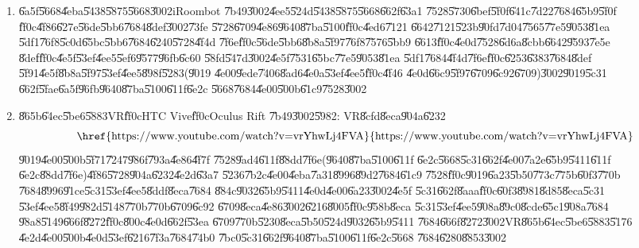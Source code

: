 \documentclass[12pt,a4paper]{article}
\begin{document}
\begin{enumerate}
\item \U{6a5f}\U{5668}\U{4eba}\U{5438}\U{5875}\U{5668}\U{3002}iRoombot%
\U{7b49}\U{3002}\U{4ee5}\U{524d}\U{5438}\U{5875}\U{5668}\U{662f}\U{63a1}%
\U{7528}\U{5730}\U{6bef}\U{5f0f}\U{641c}\U{7d22}\U{7684}\U{65b9}\U{5f0f}%
\U{ff0c}\U{4f86}\U{627e}\U{56de}\U{5bb6}\U{7684}\U{8def}\U{3002}\U{73fe}%
\U{5728}\U{6709}\U{4e86}\U{9640}\U{87ba}\U{5100}\U{ff0c}\U{4ed6}\U{7121}%
\U{6642}\U{7121}\U{523b}\U{90fd}\U{7d04}\U{7565}\U{77e5}\U{9053}\U{81ea}%
\U{5df1}\U{76f8}\U{5c0d}\U{65bc}\U{5bb6}\U{7684}\U{6240}\U{5728}\U{4f4d}%
\U{7f6e}\U{ff0c}\U{56de}\U{5bb6}\U{8b8a}\U{5f97}\U{76f8}\U{7576}\U{5bb9}%
\U{6613}\U{ff0c}\U{4e0d}\U{7528}\U{6d6a}\U{8cbb}\U{6642}\U{9593}\U{7e5e}%
\U{8def}\U{ff0c}\U{4e5f}\U{53ef}\U{4ee5}\U{5ef6}\U{9577}\U{96fb}\U{6c60}%
\U{58fd}\U{547d}\U{3002}\U{4e5f}\U{7531}\U{65bc}\U{77e5}\U{9053}\U{81ea}%
\U{5df1}\U{7684}\U{4f4d}\U{7f6e}\U{ff0c}\U{6253}\U{6383}\U{7684}\U{8def}%
\U{5f91}\U{4e5f}\U{8b8a}\U{5f97}\U{53ef}\U{4ee5}\U{898f}\U{5283}(\U{9019}%
\U{4e00}\U{9ede}\U{7406}\U{8ad6}\U{4e0a}\U{53ef}\U{4ee5}\U{ff0c}\U{4f46}%
\U{4e0d}\U{66c9}\U{5f97}\U{6709}\U{6c92}\U{6709})\U{3002}\U{9019}\U{5c31}%
\U{662f}\U{5fae}\U{6a5f}\U{96fb}\U{9640}\U{87ba}\U{5100}\U{611f}\U{6e2c}%
\U{5668}\U{7684}\U{4e00}\U{500b}\U{61c9}\U{7528}\U{3002}

\item \U{865b}\U{64ec}\U{5be6}\U{5883}VR\U{ff0c}HTC Vive\U{ff0c}Oculus Rift%
\U{7b49}\U{3002}\U{5982}: VR\U{8cfd}\U{8eca}\U{904a}\U{6232}%
\begin{equation*}
\text{\href{https://www.youtube.com/watch?v=vrYhwLj4FVA}{%
https://www.youtube.com/watch?v=vrYhwLj4FVA}}
\end{equation*}%
\U{9019}\U{4e00}\U{500b}\U{5f71}\U{7247}\U{986f}\U{793a}\U{4e86}\U{4f7f}%
\U{7528}\U{9ad4}\U{611f}\U{88dd}\U{7f6e}(\U{9640}\U{87ba}\U{5100}\U{611f}%
\U{6e2c}\U{5668}\U{5c31}\U{662f}\U{4e00}\U{7a2e}\U{65b9}\U{5411}\U{611f}%
\U{6e2c}\U{88dd}\U{7f6e})\U{4f86}\U{5728}\U{904a}\U{6232}\U{4e2d}\U{63a7}%
\U{5236}\U{7b2c}\U{4e00}\U{4eba}\U{7a31}\U{8996}\U{89d2}\U{7684}\U{61c9}%
\U{7528}\U{ff0c}\U{9019}\U{6a23}\U{5b50}\U{773c}\U{775b}\U{60f3}\U{770b}%
\U{7684}\U{8996}\U{91ce}\U{5c31}\U{53ef}\U{4ee5}\U{8ddf}\U{8eca}\U{7684}%
\U{884c}\U{9032}\U{65b9}\U{5411}\U{4e0d}\U{4e00}\U{6a23}\U{3002}\U{4e5f}%
\U{5c31}\U{662f}\U{8aaa}\U{ff0c}\U{60f3}\U{8981}\U{8d85}\U{8eca}\U{5c31}%
\U{53ef}\U{4ee5}\U{8f49}\U{982d}\U{5148}\U{770b}\U{770b}\U{6709}\U{6c92}%
\U{6709}\U{8eca}\U{4e86}\U{3002}\U{6216}\U{8005}\U{ff0c}\U{958b}\U{8eca}%
\U{5c31}\U{53ef}\U{4ee5}\U{908a}\U{89c0}\U{8cde}\U{65c1}\U{908a}\U{7684}%
\U{98a8}\U{5149}\U{666f}\U{8272}\U{ff0c}\U{800c}\U{4e0d}\U{662f}\U{53ea}%
\U{6709}\U{770b}\U{5230}\U{8eca}\U{5b50}\U{524d}\U{9032}\U{65b9}\U{5411}%
\U{7684}\U{666f}\U{8272}\U{3002}VR\U{865b}\U{64ec}\U{5be6}\U{5883}\U{5176}%
\U{4e2d}\U{4e00}\U{500b}\U{4e0d}\U{53ef}\U{6216}\U{7f3a}\U{7684}\U{74b0}%
\U{7bc0}\U{5c31}\U{662f}\U{9640}\U{87ba}\U{5100}\U{611f}\U{6e2c}\U{5668}%
\U{7684}\U{6280}\U{8853}\U{3002}


\end{enumerate}
\end{document}

